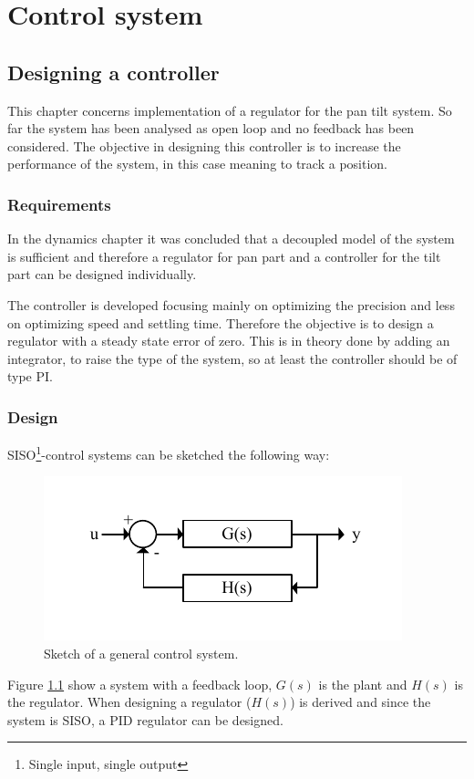 \chapter{Control system}\label{chap:control_system}
\section{Designing a controller}
This chapter concerns implementation of a regulator for the pan tilt system. So
far the system has been analysed as open loop and no feedback has been considered.
The objective in designing this controller is to increase the performance of the
system, in this case meaning to track a position. 

\subsection{Requirements}
In the dynamics chapter it was concluded that a decoupled model of the system is
sufficient and therefore a regulator for pan part and a controller for the tilt
part can be designed individually.

The controller is developed focusing mainly on optimizing the precision and less
on optimizing speed and settling time. Therefore the objective is to design a
regulator with a steady state error of zero. This is in theory done by adding
an integrator, to raise the type of the system, so at least the controller should be of type PI.

\subsection{Design}
SISO\footnote{Single input, single output}-control systems can be sketched the
following way:
\begin{figure}[htb]
  \centering
  \includegraphics[width=\textwidth,clip,trim=0 15 0 15]{graphics/control_sketch.pdf} %
	\caption{Sketch of a general control system.}
	\label{fig:control_sketch}
\end{figure}
Figure \ref{fig:control_sketch} show a system with a feedback loop, $G(s)$ is
the plant and $H(s)$ is the regulator. When designing a regulator ($H(s)$) is
derived and since the system is SISO, a PID regulator can be designed.

